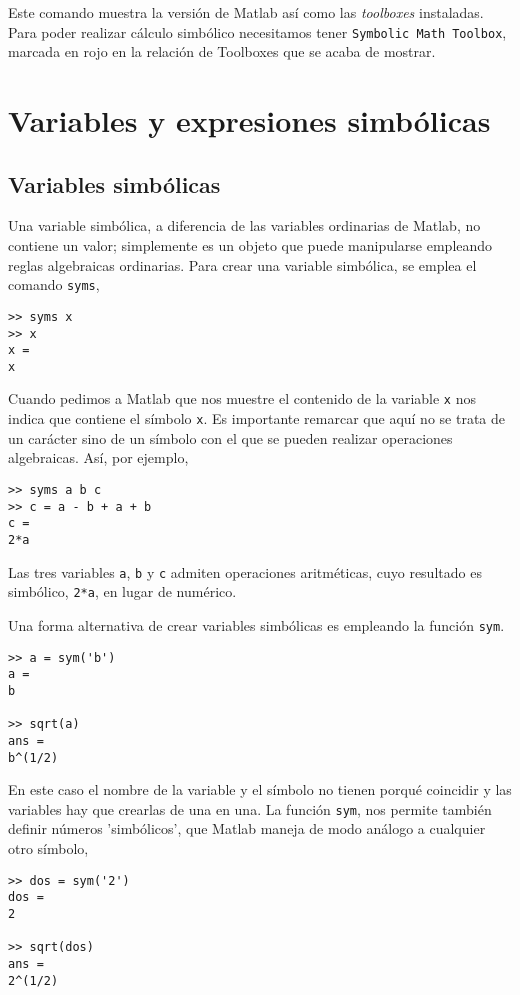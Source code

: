 Este comando muestra la versión de Matlab así como las \emph{toolboxes} instaladas. Para poder realizar cálculo simbólico necesitamos tener \texttt{Symbolic Math Toolbox}, marcada en rojo en la relación de Toolboxes que se acaba de mostrar.

\section{Variables y expresiones simbólicas}
\subsection{Variables simbólicas} 
Una variable simbólica, a diferencia de las variables ordinarias de Matlab, no contiene un valor; simplemente es un objeto que puede manipularse empleando reglas  algebraicas ordinarias. Para crear una variable simbólica, se emplea el comando \texttt{syms},

\begin{verbatim}
>> syms x
>> x
x =
x
\end{verbatim}

Cuando pedimos a Matlab que nos muestre el contenido de la variable \texttt{x} nos indica que contiene el símbolo \texttt{x}. Es importante remarcar que aquí no se trata de un carácter sino de un símbolo con el que se pueden realizar operaciones algebraicas. Así, por ejemplo,
\begin{verbatim}
>> syms a b c
>> c = a - b + a + b 
c = 
2*a
\end{verbatim}

Las tres variables \texttt{a}, \texttt{b} y \texttt{c} admiten operaciones aritméticas, cuyo resultado es simbólico, \texttt{2*a}, en lugar de numérico.

Una forma alternativa de crear variables simbólicas es empleando la función \texttt{sym}.
\begin{verbatim}
>> a = sym('b') 
a = 
b

>> sqrt(a) 
ans = 
b^(1/2)
\end{verbatim}
En este caso el nombre de la variable y el símbolo no tienen porqué coincidir y las variables hay que crearlas de una en una. La función \texttt{sym}, nos permite también definir números 'simbólicos', que Matlab maneja de modo análogo a cualquier otro símbolo,
\begin{verbatim}
>> dos = sym('2') 
dos = 
2
 
>> sqrt(dos) 
ans = 
2^(1/2)
\end{verbatim}

